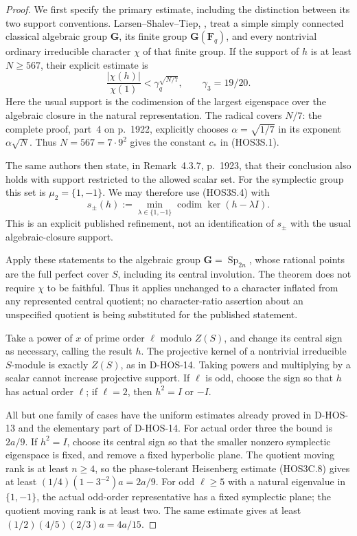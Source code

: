 \begin{proof}
We first specify the primary estimate, including the distinction
between its two support conventions. Larsen--Shalev--Tiep,
\cite[Definition~4.1.1 and (4.1.1), p.~1907; Theorem~4.3.6,
pp.~1917--1918, (4.3.2)]{HOS:LST2011}, treat a simple simply
connected classical algebraic group $\mathbf G$, its finite group
$\mathbf G(\mathbf F_q)$, and every nontrivial ordinary irreducible
character $\chi$ of that finite group. If the support of $h$ is at
least $N\ge567$, their explicit estimate is
\[
 \frac{|\chi(h)|}{\chi(1)}
       <\gamma_q^{\sqrt{N/7}},\qquad \gamma_3=19/20.
 \tag{HOS3S.4}
\]
Here the usual support is the codimension of the largest eigenspace
over the algebraic closure in the natural representation. The
radical covers $N/7$: the complete proof, part~4 on p.~1922,
explicitly chooses $\alpha=\sqrt{1/7}$ in its exponent
$\alpha\sqrt N$. Thus $N=567=7\cdot9^2$ gives the constant
$c_*$ in (HOS3S.1).

The same authors then state, in Remark~4.3.7, p.~1923, that their
conclusion also holds with support restricted to the allowed scalar
set. For the symplectic group this set is $\mu_2=\{1,-1\}$.
We may therefore use (HOS3S.4) with
\[
 s_{\pm}(h):=\min_{\lambda\in\{1,-1\}}
             \operatorname{codim}\ker(h-\lambda I).
 \tag{HOS3S.5}
\]
This is an explicit published refinement, not an identification
of $s_{\pm}$ with the usual algebraic-closure support.

Apply these statements to the algebraic group
$\mathbf G=\operatorname{Sp}_{2n}$, whose rational points are
the full perfect cover $S$, including its central involution.
The theorem does not require $\chi$ to be faithful. Thus it applies
unchanged to a character inflated from any represented central
quotient; no character-ratio assertion about an unspecified quotient
is being substituted for the published statement.

Take a power of $x$ of prime order $\ell$ modulo $Z(S)$, and
change its central sign as necessary, calling the result $h$.
The projective kernel of a nontrivial irreducible $S$-module is
exactly $Z(S)$, as in D-HOS-14. Taking powers and multiplying by
a scalar cannot increase projective support. If $\ell$ is odd,
choose the sign so that $h$ has actual order $\ell$; if $\ell=2$,
then $h^2=I$ or $-I$.

All but one family of cases have the uniform estimates already
proved in D-HOS-13 and the elementary part of D-HOS-14. For
actual order three the bound is $2a/9$. If $h^2=I$, choose its
central sign so that the smaller nonzero symplectic eigenspace is
fixed, and remove a fixed hyperbolic plane. The quotient moving
rank is at least $n\ge4$, so the phase-tolerant Heisenberg estimate
(HOS3C.8) gives at least $(1/4)(1-3^{-2})a=2a/9$.
For odd $\ell\ge5$ with a natural eigenvalue in $\{1,-1\}$,
the actual odd-order representative has a fixed symplectic plane;
the quotient moving rank is at least two. The same estimate gives
at least $(1/2)(4/5)(2/3)a=4a/15$.


\end{proof}
